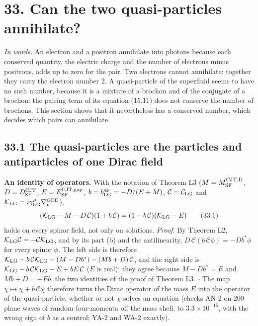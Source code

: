 \documentclass[
  10pt,
]{article}
\begin{document}
\hypertarget{can-the-two-quasi-particles-annihilate}{%
\section{33. Can the two quasi-particles
annihilate?}\label{can-the-two-quasi-particles-annihilate}}

\emph{In words.} An electron and a positron annihilate into photons
because each conserved quantity, the electric charge and the number of
electrons minus positrons, adds up to zero for the pair. Two electrons
cannot annihilate: together they carry the electron number 2. A
quasi-particle of the superfluid seems to have no such number, because
it is a mixture of a brochon and of the conjugate of a brochon: the
pairing term of its equation (15.11) does not conserve the number of
brochons. This section shows that it nevertheless has a conserved
number, which decides which pairs can annihilate.

\hypertarget{the-quasi-particles-are-the-particles-and-antiparticles-of-one-dirac-field}{%
\subsection{33.1 The quasi-particles are the particles and antiparticles
of one Dirac
field}\label{the-quasi-particles-are-the-particles-and-antiparticles-of-one-dirac-field}}

\textbf{An identity of operators.} With the notation of Theorem L3
(\(M=M^{\rm CJT,D}_{\rm SF}\), \(D=D^{\rm CJT}_{\rm SF}\),
\(E=E^{\rm CJT,gap}_{\rm SF}\), \(b=b^{\rm qp}_{\rm LG}=-D/(E+M)\),
\(\mathcal C=\mathcal C_{\rm LG}\) and
\(\mathcal K_{\rm LG}=i\gamma^\mu_{\rm LG}\nabla^{\rm GEE}_\mu\)),
\[(\mathcal K_{\rm LG}-M-D\,\mathcal C)(1+b\,\mathcal C)=(1-b\,\mathcal C)(\mathcal K_{\rm LG}-E)\tag{33.1}\]
holds on every spinor field, not only on solutions. \emph{Proof.} By
Theorem L2,
\(\mathcal K_{\rm LG}\mathcal C=-\mathcal C\mathcal K_{\rm LG}\), and by
its part (b) and the antilinearity,
\(D\,\mathcal C(b\,\mathcal C\phi)=-Db^*\phi\) for every spinor
\(\phi\). The left side is therefore
\(\mathcal K_{\rm LG}-b\,\mathcal C\mathcal K_{\rm LG}-(M-Db^*)-(Mb+D)\,\mathcal C\),
and the right side is
\(\mathcal K_{\rm LG}-b\,\mathcal C\mathcal K_{\rm LG}-E+bE\,\mathcal C\)
(\(E\) is real); they agree because \(M-Db^*=E\) and \(Mb+D=-Eb\), the
two identities of the proof of Theorem L3. \(\square\) The map
\(\chi\mapsto\chi+b\,\mathcal C\chi\) therefore turns the Dirac operator
of the mass \(E\) into the operator of the quasi-particle, whether or
not \(\chi\) solves an equation (checks AN-2 on 200 plane waves of
random four-momenta off the mass shell, to \(3.3\times10^{-15}\), with
the wrong sign of \(b\) as a control; YA-2 and WA-2 exactly).
\end{document}

